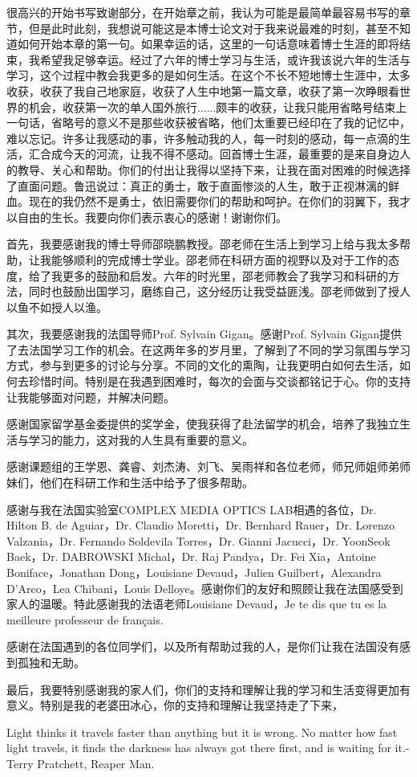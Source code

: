 
\begin{thanks}

很高兴的开始书写致谢部分，在开始章之前，我认为可能是最简单最容易书写的章节，但是此时此刻，我想说可能这是本博士论文对于我来说最难的时刻，甚至不知道如何开始本章的第一句。如果幸运的话，这里的一句话意味着博士生涯的即将结束，我希望我足够幸运。经过了六年的博士学习与生活，或许我该说六年的生活与学习，这个过程中教会我更多的是如何生活。在这个不长不短地博士生涯中，太多收获，收获了我自己地家庭，收获了人生中地第一篇文章，收获了第一次睁眼看世界的机会，收获第一次的单人国外旅行......颇丰的收获，让我只能用省略号结束上一句话，省略号的意义不是那些收获被省略，他们太重要已经印在了我的记忆中，难以忘记。许多让我感动的事，许多触动我的人，每一时刻的感动，每一点滴的生活，汇合成今天的河流，让我不得不感动。回首博士生涯，最重要的是来自身边人的教导、关心和帮助。你们的付出让我得以坚持下来，让我在面对困难的时候选择了直面问题。鲁迅说过：真正的勇士，敢于直面惨淡的人生，敢于正视淋漓的鲜血。现在的我仍然不是勇士，依旧需要你们的帮助和呵护。在你们的羽翼下，我才以自由的生长。我要向你们表示衷心的感谢！谢谢你们。

首先，我要感谢我的博士导师邵晓鹏教授。邵老师在生活上到学习上给与我太多帮助，让我能够顺利的完成博士学业。邵老师在科研方面的视野以及对于工作的态度，给了我更多的鼓励和启发。六年的时光里，邵老师教会了我学习和科研的方法，同时也鼓励出国学习，磨练自己，这分经历让我受益匪浅。邵老师做到了授人以鱼不如授人以渔。

其次，我要感谢我的法国导师Prof. Sylvain Gigan。感谢Prof. Sylvain Gigan提供了去法国学习工作的机会。在这两年多的岁月里，了解到了不同的学习氛围与学习方式，参与到更多的讨论与分享。不同的文化的熏陶，让我更明白如何去生活，如何去珍惜时间。特别是在我遇到困难时，每次的会面与交谈都铭记于心。你的支持让我能够面对问题，并解决问题。

感谢国家留学基金委提供的奖学金，使我获得了赴法留学的机会，培养了我独立生活与学习的能力，这对我的人生具有重要的意义。

感谢课题组的王学恩、龚睿、刘杰涛、刘飞、吴雨祥和各位老师，师兄师姐师弟师妹们，他们在科研工作和生活中给予了很多帮助。

感谢与我在法国实验室COMPLEX MEDIA OPTICS LAB相遇的各位，Dr. Hilton B. de Aguiar，Dr. Claudio Moretti，Dr. Bernhard Rauer，Dr. Lorenzo Valzania，Dr. Fernando Soldevila Torres，Dr. Gianni Jacucci，Dr. YoonSeok Baek，Dr. DABROWSKI Michal，Dr. Raj Pandya，Dr. Fei Xia，Antoine Boniface，Jonathan Dong，Louisiane Devaud，Julien Guilbert，Alexandra D’Arco，Lea Chibani，Louis Delloye。感谢你们的友好和照顾让我在法国感受到家人的温暖。特此感谢我的法语老师Louisiane Devaud，Je te dis que tu es la meilleure professeur de français.

感谢在法国遇到的各位同学们，以及所有帮助过我的人，是你们让我在法国没有感到孤独和无助。

最后，我要特别感谢我的家人们，你们的支持和理解让我的学习和生活变得更加有意义。特别是我的老婆田冰心，你的支持和理解让我坚持走了下来，

Light thinks it travels faster than anything but it is wrong. No matter how fast light travels, it finds the darkness has always got there first, and is waiting for it.-Terry Pratchett, Reaper Man.
\end{thanks}
